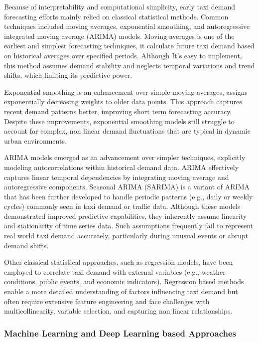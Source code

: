 \documentclass{article}
\begin{document}
Because of interpretability and computational simplicity, early taxi demand forecasting efforts mainly relied on classical statistical methods. Common techniques included moving averages, exponential smoothing, and autoregressive integrated moving average (ARIMA) models\cite{faghih_2020_taxi)}. Moving averages is one of the earliest and simplest forecasting techniques, it calculate future taxi demand based on historical averages over specified periods. Although It's easy to implement, this method assumes demand stability and neglects temporal variations and trend shifts, which limiting its predictive power.\cite{faghih_2020_taxi}

Exponential smoothing is an enhancement over simple moving averages, assigns exponentially decreasing weights to older data points. This approach captures recent demand patterns better, improving short term forecasting accuracy. Despite these improvements, exponential smoothing models still struggle to account for complex, non linear demand fluctuations that are typical in dynamic urban environments.

ARIMA models emerged as an advancement over simpler techniques, explicitly modeling autocorrelations within historical demand data\cite{faghih_2020_taxi}. ARIMA effectively captures linear temporal dependencies by integrating moving average and autoregressive components. Seasonal ARIMA (SARIMA) is a variant of ARIMA that has been further developed to handle periodic patterns (e.g., daily or weekly cycles) commonly seen in taxi demand or traffic data\cite{williams_2003_modeling}. Although these models demonstrated improved predictive capabilities, they inherently assume linearity and stationarity of time series data. Such assumptions frequently fail to represent real world taxi demand accurately, particularly during unusual events or abrupt demand shifts.

Other classical statistical approaches, such as regression models, have been employed to correlate taxi demand with external variables (e.g., weather conditions, public events, and economic indicators)\cite{schaller_2005_a}. Regression based methods enable a more detailed understanding of factors influencing taxi demand but often require extensive feature engineering and face challenges with multicollinearity, variable selection, and capturing non linear relationships\cite{schaller_2005_a}.

\subsubsection{Machine Learning and Deep Learning based Approaches}
\end{document}
